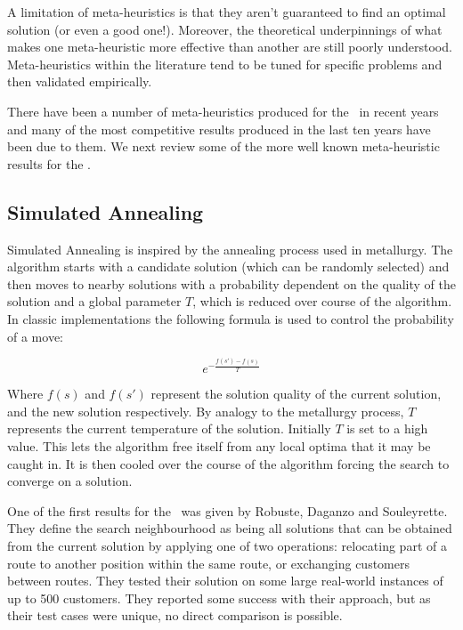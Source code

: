 
A limitation of meta-heuristics is that they aren't guaranteed to find an optimal solution (or even a good one!). Moreover, the theoretical underpinnings of what makes one meta-heuristic more effective than another are still poorly understood. Meta-heuristics within the literature tend to be tuned for specific problems and then validated empirically.

There have been a number of meta-heuristics produced for the \VRP\ in recent years and many of the most competitive results produced in the last ten years have been due to them. We next review some of the more well known meta-heuristic results for the \VRP.

\subsection{Simulated Annealing}

Simulated Annealing is inspired by the annealing process used in metallurgy. The algorithm starts with a candidate solution (which can be randomly selected) and then moves to nearby solutions with a probability dependent on the quality of the solution and a global parameter $T$, which is reduced over course of the algorithm. In classic implementations the following formula is used to control the probability of a move: 

\[
e^{-\frac{f(s')-f(s)}{T}}
\]

Where $f(s)$ and $f(s')$ represent the solution quality of the current solution, and the new solution respectively. By analogy to the metallurgy process, $T$ represents the current temperature of the solution. Initially $T$ is set to a high value. This lets the algorithm free itself from any local optima that it may be caught in. It is then cooled over the course of the algorithm forcing the search to converge on a solution. 

One of the first results for the \VRP\ was given by Robuste, Daganzo and Souleyrette\cite{RDS:1990}. They define the search neighbourhood as being all solutions that can be obtained from the current solution by applying one of two operations: relocating part of a route to another position within the same route, or exchanging customers between routes. They tested their solution on some large real-world instances of up to 500 customers. They reported some success with their approach, but as their test cases were unique, no direct comparison is possible. 

